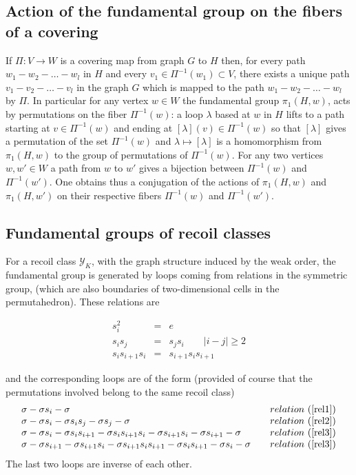 \documentclass[11pt,a4paper]{amsart}
\theoremstyle{contraction}
\begin{document}
\subsection{Action of the fundamental group on the fibers of a covering}
If $\Pi:V\to W$ is a covering map from graph  $G$ to $H$ then, for every path $w_1-w_2-\ldots -w_l$ in  $H$ and every $v_1\in\Pi^{-1}(w_1)\subset V$, there exists a unique path $v_1-v_2-\ldots -v_l$ in the graph $G$ which is mapped to the path $w_1-w_2-\ldots- w_l$ by $\Pi$. In particular for any vertex $w\in W$ the fundamental group  $\pi_1(H,w)$, acts by permutations on the fiber
$\Pi^{-1}(w)$: a loop $\lambda$ based at $w$ in $H$ lifts to a path starting at $v\in\Pi^{-1}(w)$ and ending at $[\lambda](v)\in\Pi^{-1}(w)$ so that $[\lambda]$ gives a permutation of the set  $\Pi^{-1}(w)$ and $\lambda\mapsto[\lambda]$ is a homomorphism from $\pi_1(H,w)$ to the group of  permutations of $\Pi^{-1}(w)$. For any two vertices $w,w'\in W$ a path from $w$ to $w'$ gives a bijection between $\Pi^{-1}(w)$ and  $\Pi^{-1}(w')$. One obtains thus a conjugation of the actions  of $\pi_1(H,w)$ and $\pi_1(H,w')$ on their respective fibers $\Pi^{-1}(w)$ and $\Pi^{-1}(w')$.

\subsection{Fundamental groups of recoil classes}
For a recoil class ${\mathcal Y}_K$, with the graph structure induced by the weak order,
the fundamental group is generated by  loops  coming from relations in the symmetric group, (which are  also boundaries of two-dimensional cells in the permutahedron).
These relations are
 
 \begin{eqnarray}
 s_i^2&=&e\label{rel1}\\
  s_is_j&=&s_js_i\qquad |i-j|\geq 2\label{rel2}\\
  s_is_{i+1}s_i&=&s_{i+1}s_is_{i+1}\label{rel3}
  \end{eqnarray}
  
 and the corresponding loops are of the form (provided of course that  the permutations involved belong to  the same recoil class)
$$ \begin{array}{lr}
 \sigma-\sigma s_i- \sigma& \quad relation\ (\ref{rel1})\\
 \sigma-\sigma s_i- \sigma s_is_j-\sigma s_j-\sigma&\quad relation\ (\ref{rel2})\\
 \sigma-\sigma s_i- \sigma s_is_{i+1}-\sigma s_is_{i+1}s_i-\sigma s_{i+1}s_i-\sigma s_{i+1}-\sigma&\quad relation\ (\ref{rel3})\\
 \sigma-\sigma s_{i+1}- \sigma s_{i+1}s_i-\sigma s_{i+1}s_is_{i+1}-\sigma s_is_{i+1}-\sigma s_i-\sigma&\quad relation\ (\ref{rel3})
 \end{array}
 $$
 The last two loops are inverse of each other.
 
\end{document}

